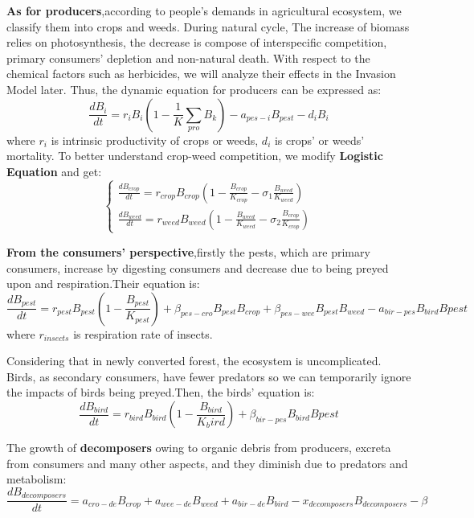 \documentclass[12pt]{article}
\begin{document}
	\textbf{As for producers},according to people's demands in agricultural ecosystem, we classify them into crops and weeds. During natural cycle, The increase of biomass relies on photosynthesis, the decrease is compose of interspecific competition, primary consumers' depletion and non-natural death. With respect to the chemical factors such as herbicides, we will analyze their effects in the Invasion Model later. Thus, the dynamic equation for producers can be expressed as:
	\begin{equation}
		\frac{dB_i}{dt}=r_iB_i(1-\frac{1}{K}\sum_{pro}B_k)-a_{pes-i}B_{pest}-d_iB_i
		\label{original}
	\end{equation}
	where $r_i$ is intrinsic productivity of crops or weeds, $d_i$ is crops' or weeds' mortality.
	To better understand crop-weed competition, we modify \textbf{Logistic Equation} and get:
	\begin{equation}
		\begin{cases}
			\frac{dB_{crop}}{dt}=r_{crop}B_{crop}(1-\frac{B_{crop}}{K_{crop}}-\sigma_1\frac{B_{weed}}{K_{weed}})\\
			\frac{dB_{weed}}{dt}=r_{weed}B_{weed}(1-\frac{B_{weed}}{K_{weed}}-\sigma_2\frac{B_{crop}}{K_{crop}})
			\label{comp}
		\end{cases}
	\end{equation}
	
	\textbf{From the consumers' perspective},firstly the pests, which are primary consumers, increase by digesting consumers and decrease due to being preyed upon and respiration.Their equation is:
	\begin{equation}
		\frac{dB_{pest}}{dt}=r_{pest}B_{pest}(1-\frac{B_{pest}}{K_{pest}})+\beta_{pes-cro}B_{pest}B_{crop}+\beta_{pes-wee}B_{pest}B_{weed}-a_{bir-pes}B_{bird}B{pest}
		\label{insect}
	\end{equation}
	where $r_{insects}$ is respiration rate of insects.
	
	Considering that in newly converted forest, the ecosystem is uncomplicated. Birds, as secondary consumers, have fewer predators so we can temporarily ignore the impacts of birds being preyed.Then, the birds' equation is:
	\begin{equation}
		\frac{dB_{bird}}{dt}=r_{bird}B_{bird}(1-\frac{B_{bird}}{K_bird})+\beta_{bir-pes}B_{bird}B{pest}
		\label{bird}
	\end{equation}
	
	The growth of \textbf{decomposers} owing to organic debris from producers, excreta from consumers and many other aspects, and they diminish due to predators and metabolism:
	\begin{equation}
		\frac{dB_{decomposers}}{dt}=a_{cro-de}B_{crop}+a_{wee-de}B_{weed}+a_{bir-de}B_{bird}-x_{decomposers}B_{decomposers}-\beta
	\end{equation}
	
\end{document}
